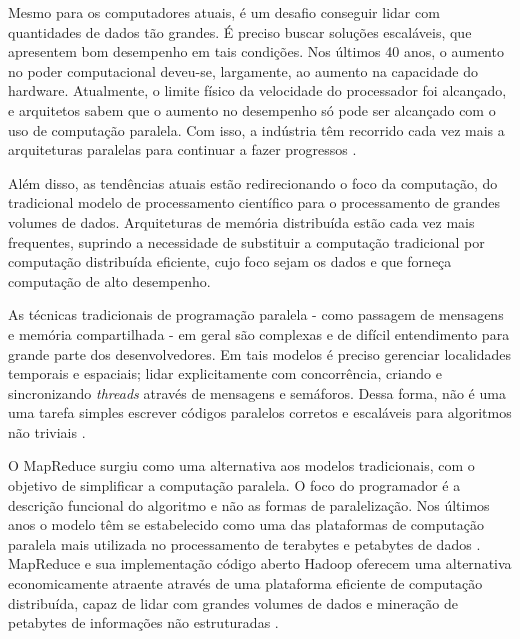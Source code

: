
Mesmo para os computadores atuais, é um desafio conseguir lidar com quantidades de dados tão grandes. É preciso buscar soluções escaláveis, que apresentem bom desempenho em tais condições. 
Nos últimos 40 anos, o aumento no poder computacional deveu-se, largamente, ao aumento na capacidade do hardware. Atualmente, o limite físico da velocidade do processador foi alcançado, e arquitetos sabem que o aumento no desempenho só pode ser alcançado com o uso de computação paralela. Com isso, a indústria têm recorrido cada vez mais a arquiteturas paralelas para continuar a fazer progressos \cite{Manferdelli:2008}. 

Além disso, as tendências atuais estão redirecionando o foco da computação, do tradicional modelo de processamento científico para o processamento de grandes volumes de dados. Arquiteturas de memória distribuída estão cada vez mais frequentes, suprindo a necessidade de substituir a computação tradicional por computação distribuída eficiente, cujo foco sejam os dados e que forneça computação de alto desempenho\cite{Bryant:2011}. 



As técnicas tradicionais de programação paralela - como passagem de mensagens e memória compartilhada - em geral são complexas e de difícil entendimento para grande parte dos desenvolvedores. Em tais modelos é preciso gerenciar localidades temporais e espaciais; lidar explicitamente com concorrência, criando e sincronizando \textit{threads} através de mensagens e semáforos. Dessa forma, não é uma uma tarefa simples escrever códigos paralelos corretos e escaláveis para algoritmos não triviais \cite{Ranger:2007}.


O MapReduce surgiu como uma alternativa aos modelos tradicionais, com o objetivo de simplificar a computação paralela. 
O foco do programador é a descrição funcional do algoritmo e não as formas de paralelização. Nos últimos anos o modelo têm se estabelecido como uma das plataformas de computação paralela mais utilizada no processamento de terabytes e petabytes de dados \cite{Ranger:2007}.
MapReduce e sua implementação código aberto Hadoop oferecem  uma alternativa economicamente atraente através de uma plataforma eficiente de computação distribuída, capaz de lidar com grandes volumes de dados e mineração de petabytes de informações não estruturadas \cite{Cherkasova:2011}.

